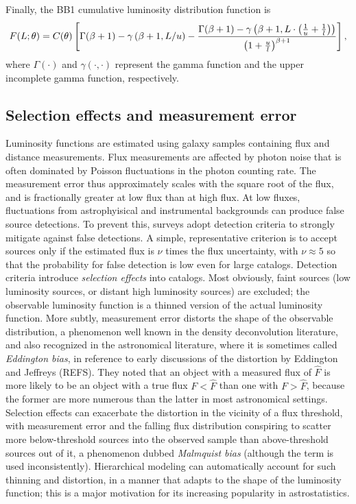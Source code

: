 Finally, the BB1 cumulative luminosity distribution function is 
\begin{equation}
\label{eq:lumCDF} 
F(L ; \theta) = 
  C(\theta)
  \left[ \Gamma(\beta + 1) - \gamma\left(\beta + 1, L/u\right) - \frac{\Gamma(\beta + 1)-\gamma\left(\beta + 1, L\cdot\left(\frac{1}{u}+\frac{1}{l}\right)\right)}{\left(1 + \frac{u}{l}\right)^{\beta + 1}} \right],
\end{equation}
where $\Gamma(\cdot)$ and $\gamma(\cdot, \cdot)$ represent the gamma function and the upper incomplete gamma function, respectively.

\subsection{Selection effects and measurement error}
\label{sec:slxn+err}


Luminosity functions are estimated using galaxy samples containing flux and distance measurements.
Flux measurements are affected by photon noise that is often dominated by Poisson fluctuations in the photon counting rate.
The measurement error thus approximately scales with the square root of the flux, and is fractionally greater at low flux than at high flux.
At low fluxes, fluctuations from astrophyisical and instrumental backgrounds can produce false source detections.
To prevent this, surveys adopt detection criteria to strongly mitigate against false detections.
A simple, representative criterion is to accept sources only if the estimated flux is $\nu$ times the flux uncertainty, with $\nu \approx 5$ so that the probability for false detection is low even for large catalogs.
Detection criteria introduce \emph{selection effects} into catalogs.
Most obviously, faint sources (low luminosity sources, or distant high luminosity sources) are excluded; the observable luminosity function is a thinned version of the actual luminosity function.
More subtly, measurement error distorts the shape of the observable distribution, a phenomenon well known in the density deconvolution literature, and also recognized in the astronomical literature, where it is sometimes called \emph{Eddington bias}, in reference to early discussions of the distortion by Eddington and Jeffreys (REFS).
They noted that an object with a measured flux of $\hat F$ is more likely to be an object with a true flux $F < \hat F$ than one with $F > \hat F$, because the former are more numerous than the latter in most astronomical settings.
Selection effects can exacerbate the distortion in the vicinity of a flux threshold, with measurement error and the falling flux distribution conspiring to scatter more below-threshold sources into the observed sample than above-threshold sources out of it, a phenomenon dubbed \emph{Malmquist bias} \citep{binney1998galactic} (although the term is used inconsistently).
Hierarchical modeling can automatically account for such thinning and distortion, in a manner that adapts to the shape of the luminosity function; this is a major motivation for its increasing popularity in astrostatistics.


